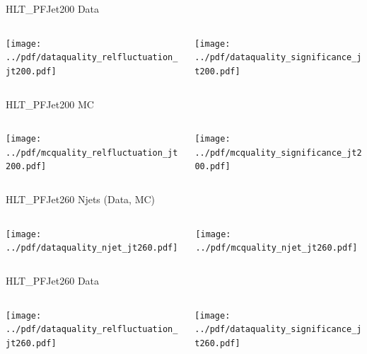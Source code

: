 \documentclass[9pt]{beamer}
\begin{document}
\begin{frame}[t]{HLT\_PFJet200 Data}
\begin{columns}[T]
  \begin{column}{.5\textwidth}
  \texttt{[image: ../pdf/dataquality\_relfluctuation\_jt200.pdf]}
  \end{column}
  \begin{column}{.5\textwidth}
  \texttt{[image: ../pdf/dataquality\_significance\_jt200.pdf]}
  \end{column}
\end{columns}
\end{frame}

\begin{frame}[t]{HLT\_PFJet200 MC}
\begin{columns}[T]
  \begin{column}{.5\textwidth}
  \texttt{[image: ../pdf/mcquality\_relfluctuation\_jt200.pdf]}
  \end{column}
  \begin{column}{.5\textwidth}
  \texttt{[image: ../pdf/mcquality\_significance\_jt200.pdf]}
  \end{column}
\end{columns}
\end{frame}

\begin{frame}[t]{HLT\_PFJet260 Njets (Data, MC)}
\begin{columns}[T]
  \begin{column}{.5\textwidth}
  \texttt{[image: ../pdf/dataquality\_njet\_jt260.pdf]}
  \end{column}
  \begin{column}{.5\textwidth}
  \texttt{[image: ../pdf/mcquality\_njet\_jt260.pdf]}
  \end{column}
\end{columns}
\end{frame}

\begin{frame}[t]{HLT\_PFJet260 Data}
\begin{columns}[T]
  \begin{column}{.5\textwidth}
  \texttt{[image: ../pdf/dataquality\_relfluctuation\_jt260.pdf]}
  \end{column}
  \begin{column}{.5\textwidth}
  \texttt{[image: ../pdf/dataquality\_significance\_jt260.pdf]}
  \end{column}
\end{columns}
\end{frame}
\end{document}
